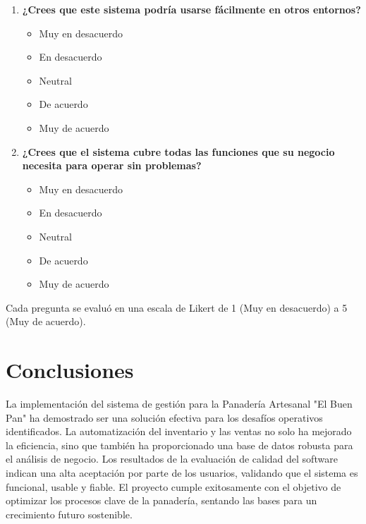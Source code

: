 \documentclass[conference]{IEEEtran}
\begin{document}
\begin{enumerate}
    \item \textbf{¿Crees que este sistema podría usarse fácilmente en otros entornos?}
        \begin{itemize}
            \item Muy en desacuerdo
            \item En desacuerdo
            \item Neutral
            \item De acuerdo
            \item Muy de acuerdo
        \end{itemize}
        
    \item \textbf{¿Crees que el sistema cubre todas las funciones que su negocio necesita para operar sin problemas?}
        \begin{itemize}
            \item Muy en desacuerdo
            \item En desacuerdo
            \item Neutral
            \item De acuerdo
            \item Muy de acuerdo
        \end{itemize}
\end{enumerate}
Cada pregunta se evaluó en una escala de Likert de 1 (Muy en desacuerdo) a 5 (Muy de acuerdo).
\section{Conclusiones}
La implementación del sistema de gestión para la Panadería Artesanal "El Buen Pan" ha demostrado ser una solución efectiva para los desafíos operativos identificados. La automatización del inventario y las ventas no solo ha mejorado la eficiencia, sino que también ha proporcionado una base de datos robusta para el análisis de negocio. Los resultados de la evaluación de calidad del software indican una alta aceptación por parte de los usuarios, validando que el sistema es funcional, usable y fiable. El proyecto cumple exitosamente con el objetivo de optimizar los procesos clave de la panadería, sentando las bases para un crecimiento futuro sostenible.

\end{document}
